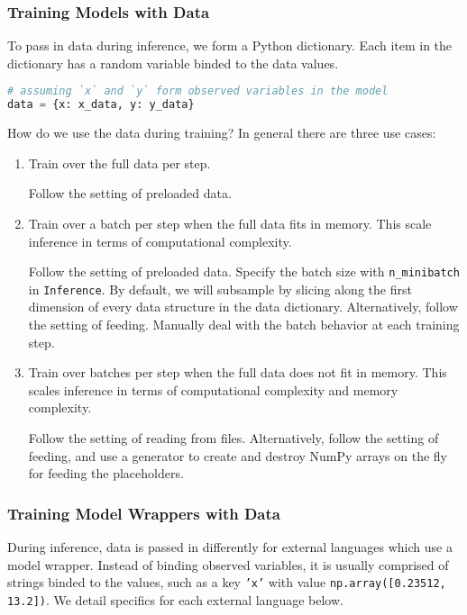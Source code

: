\subsubsection{Training Models with Data}

To pass in data during inference, we form a Python dictionary. Each
item in the dictionary has a random variable binded to the data
values.

\begin{lstlisting}[language=Python]
# assuming `x` and `y` form observed variables in the model
data = {x: x_data, y: y_data}
\end{lstlisting}


How do we use the data during training? In general there are three use
cases:

\begin{enumerate}
\item
Train over the full data per step.

Follow the setting of preloaded data.
\item
Train over a batch per step when the full data fits in memory. This
scale inference in terms of computational complexity.

Follow the setting of preloaded data. Specify the batch size with
\texttt{n_minibatch} in \texttt{Inference}. By default, we will subsample by
slicing along the first dimension of every data structure in the
data dictionary. Alternatively, follow the setting of feeding.
Manually deal with the batch behavior at each training step.
\item
Train over batches per step when the full data does not fit in
memory. This scales inference in terms of computational complexity and
memory complexity.

Follow the setting of reading from files. Alternatively, follow the
setting of feeding, and use a generator to create and destroy NumPy
arrays on the fly for feeding the placeholders.
\end{enumerate}


\subsubsection{Training Model Wrappers with Data}

During inference, data is passed in differently for external
languages which use a model wrapper. Instead of binding observed
variables, it is usually comprised
of strings binded to the values, such as a key \texttt{'x'} with value
\texttt{np.array([0.23512, 13.2])}.
We detail specifics for each external language below.

